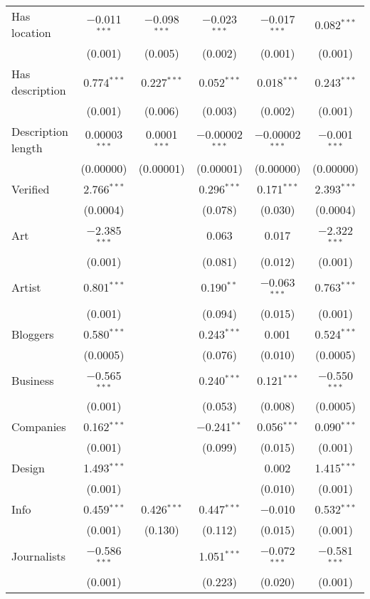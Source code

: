 \begin{table}[!htbp]
\begin{tabular}{@{\extracolsep{5pt}}lccccc}
  Has location & $-$0.011$^{***}$ & $-$0.098$^{***}$ & $-$0.023$^{***}$ & $-$0.017$^{***}$ & 0.082$^{***}$ \\ 
  & (0.001) & (0.005) & (0.002) & (0.001) & (0.001) \\ 
  Has description & 0.774$^{***}$ & 0.227$^{***}$ & 0.052$^{***}$ & 0.018$^{***}$ & 0.243$^{***}$ \\ 
  & (0.001) & (0.006) & (0.003) & (0.002) & (0.001) \\ 
  Description length & 0.00003$^{***}$ & 0.0001$^{***}$ & $-$0.00002$^{***}$ & $-$0.00002$^{***}$ & $-$0.001$^{***}$ \\ 
  & (0.00000) & (0.00001) & (0.00001) & (0.00000) & (0.00000) \\ 
  Verified & 2.766$^{***}$ &  & 0.296$^{***}$ & 0.171$^{***}$ & 2.393$^{***}$ \\ 
  & (0.0004) &  & (0.078) & (0.030) & (0.0004) \\ 
  Art & $-$2.385$^{***}$ &  & 0.063 & 0.017 & $-$2.322$^{***}$ \\ 
  & (0.001) &  & (0.081) & (0.012) & (0.001) \\ 
  Artist & 0.801$^{***}$ &  & 0.190$^{**}$ & $-$0.063$^{***}$ & 0.763$^{***}$ \\ 
  & (0.001) &  & (0.094) & (0.015) & (0.001) \\ 
  Bloggers & 0.580$^{***}$ &  & 0.243$^{***}$ & 0.001 & 0.524$^{***}$ \\ 
  & (0.0005) &  & (0.076) & (0.010) & (0.0005) \\ 
  Business & $-$0.565$^{***}$ &  & 0.240$^{***}$ & 0.121$^{***}$ & $-$0.550$^{***}$ \\ 
  & (0.001) &  & (0.053) & (0.008) & (0.0005) \\ 
  Companies & 0.162$^{***}$ &  & $-$0.241$^{**}$ & 0.056$^{***}$ & 0.090$^{***}$ \\ 
  & (0.001) &  & (0.099) & (0.015) & (0.001) \\ 
  Design & 1.493$^{***}$ &  &  & 0.002 & 1.415$^{***}$ \\ 
  & (0.001) &  &  & (0.010) & (0.001) \\ 
  Info & 0.459$^{***}$ & 0.426$^{***}$ & 0.447$^{***}$ & $-$0.010 & 0.532$^{***}$ \\ 
  & (0.001) & (0.130) & (0.112) & (0.015) & (0.001) \\ 
  Journalists & $-$0.586$^{***}$ &  & 1.051$^{***}$ & $-$0.072$^{***}$ & $-$0.581$^{***}$ \\ 
  & (0.001) &  & (0.223) & (0.020) & (0.001) \\ 

\end{tabular}
\end{table}
